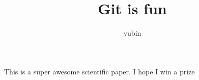 \documentclass[10pt]{article}
\author{yubin}
\title{Git is fun}
\begin{document}
        \maketitle

        This is a super awesome scientific paper.
        I hope I win a prize
\end{document}
